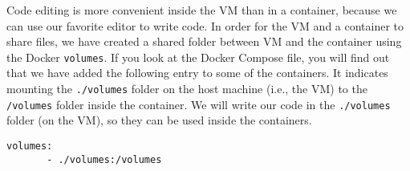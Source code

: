 Code editing is more convenient inside the VM than in a container, 
because we can use our favorite editor to write code. 
In order for the VM and a container to share files, 
we have created a shared folder between VM and the container
using the Docker \texttt{volumes}.
If you look at the Docker Compose file, you will find out that
we have added the following entry to some of the containers.
It indicates mounting the \texttt{./volumes} folder on the host
machine (i.e., the VM) to the \texttt{/volumes} folder inside the container.
We will write our code in the \texttt{./volumes} folder (on the VM), so they
can be used inside the containers.

\begin{lstlisting}
volumes:
       - ./volumes:/volumes
\end{lstlisting}


